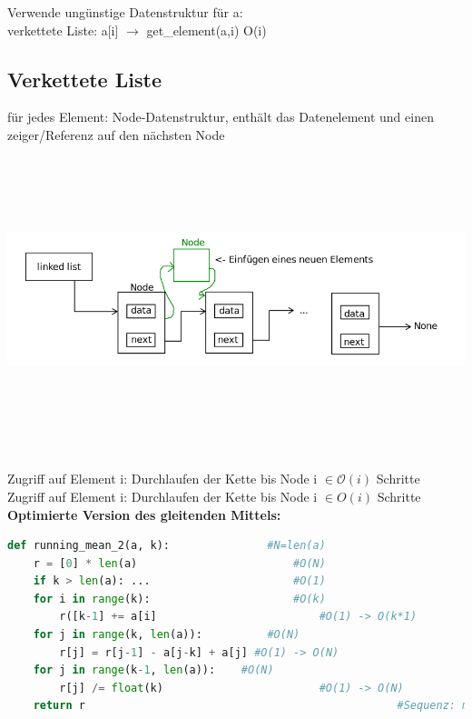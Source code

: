 \documentclass[11pt, fleqn]{scrreprt}
\begin{document}
Verwende ungünstige Datenstruktur für a: \\
verkettete Liste: a[i] $\rightarrow$ get\_element(a,i) \hspace*{1cm} O(i)\\

\subsection*{Verkettete Liste}
für jedes Element: Node-Datenstruktur, enthält das Datenelement und einen zeiger/Referenz auf den nächsten Node \\

\includegraphics[width=15cm,height=9cm,keepaspectratio]{./Pictures/linkedlist.png}

Zugriff auf Element i: Durchlaufen der Kette bis Node i $\in \mathcal{O}(i)$ Schritte \\

Zugriff auf Element i: Durchlaufen der Kette bis Node i $\in O(i)$ Schritte \\

\textbf{Optimierte Version des gleitenden Mittels:}
\begin{lstlisting}[language=Python]
def running_mean_2(a, k):   			#N=len(a)
	r = [0] * len(a)        				#O(N)
	if k > len(a): ...      				#O(1)
	for i in range(k):      				#O(k)
		r([k-1] += a[i]     					#O(1) -> O(k*1)
	for j in range(k, len(a)):			#O(N)
		r[j] = r[j-1] - a[j-k] + a[j] #O(1) -> O(N)
	for j in range(k-1, len(a)):  	#O(N)
		r[j] /= float(k)     					#O(1) -> O(N) 
	return r												#Sequenz: maximum-> O(N) (statt O(N*k))
\end{lstlisting}
\end{document}
